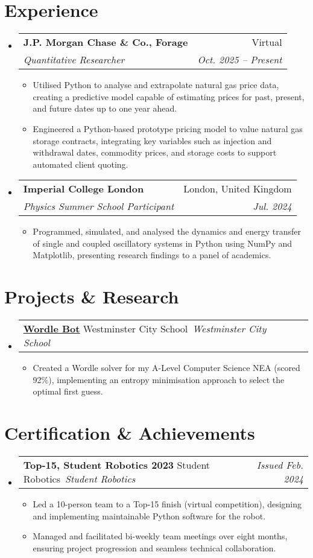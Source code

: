 \documentclass[letterpaper,11pt]{article}
\makeatletter
\newcommand{\resumeItem}[1]{
    \item\small{
        {#1 \vspace{-2pt}}
    }
}
\newcommand{\resumeSubheading}[4]{
    \vspace{-1pt}\item
        \begin{tabular*}{0.97\textwidth}[t]{l@{\extracolsep{\fill}}r}
            \textbf{#1} & #2 \\
            \textit{\small#3} & \textit{\small #4} \\
        \end{tabular*}\vspace{-5pt}
}
\newcommand{\resumeEntry}[3][]{
    \item %
    \begin{tabular*}{0.97\textwidth}[t]{l@{\extracolsep{\fill}}r}
        \textbf{#2} \ifx\relax#1\relax \else \textbar\ \textit{\small #1} \fi
        & \textit{\small #3}
    \end{tabular*}\vspace{-5pt}
    \resumeItemListStart
}
\newcommand{\resumeEntryEnd}{
    \resumeItemListEnd
}
\newcommand{\projectLink}[2]{\href{#1}{\underline{#2}}}
\newcommand{\resumeSubHeadingListStart}{\begin{itemize}[leftmargin=0.15in, label={}]}
\newcommand{\resumeSubHeadingListEnd}{\end{itemize}}
\newcommand{\resumeItemListStart}{\begin{itemize}}
\newcommand{\resumeItemListEnd}{\end{itemize}\vspace{-5pt}}
\makeatother
\begin{document}
\section{Experience}
    \resumeSubHeadingListStart
        \resumeSubheading
            {J.P. Morgan Chase \& Co., Forage}{Virtual}
            {Quantitative Researcher}{Oct. 2025 -- Present}
            \resumeItemListStart
                \resumeItem{Utilised Python to analyse and extrapolate natural gas price data, creating a predictive model capable of estimating prices for past, present, and future dates up to one year ahead.}
                \resumeItem{Engineered a Python-based prototype pricing model to value natural gas storage contracts, integrating key variables such as injection and withdrawal dates, commodity prices, and storage costs to support automated client quoting.}
            \resumeItemListEnd
        \resumeSubheading
            {Imperial College London}{London, United Kingdom}
            {Physics Summer School Participant}{Jul. 2024}
            \resumeItemListStart
                \resumeItem{Programmed, simulated, and analysed the dynamics and energy transfer of single and coupled oscillatory systems in Python using NumPy and Matplotlib, presenting research findings to a panel of academics.}
            \resumeItemListEnd

  \resumeSubHeadingListEnd

\section{Projects \& Research}
    \resumeSubHeadingListStart
        \resumeEntry[Westminster City School]{\projectLink{https://github.com/j4m3su0/wordle-bot}{Wordle Bot}}{}
            \resumeItem{Created a Wordle solver for my A-Level Computer Science NEA (scored 92\%), implementing an entropy minimisation approach to select the optimal first guess.}
        \resumeEntryEnd
    \resumeSubHeadingListEnd

\section{Certification \& Achievements}
    \resumeSubHeadingListStart
        \resumeEntry[Student Robotics]{Top-15, Student Robotics 2023}{Issued Feb. 2024}
            \resumeItem{Led a 10-person team to a Top-15 finish (virtual competition), designing and implementing maintainable Python software for the robot.}
            \resumeItem{Managed and facilitated bi-weekly team meetings over eight months, ensuring project progression and seamless technical collaboration.}
        \resumeEntryEnd
    \resumeSubHeadingListEnd
\end{document}

